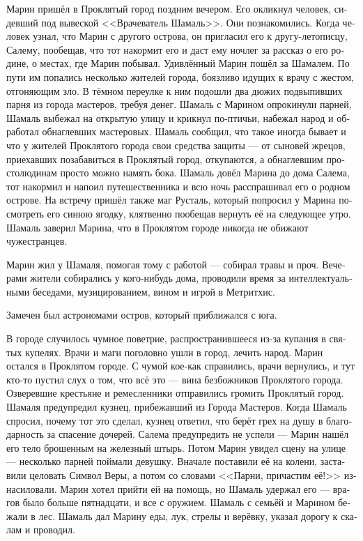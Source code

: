 \documentclass[a4paper,12pt,fleqn]{book}\usepackage{polyglossia}\setdefaultlanguage[babelshorthands=true]{russian}\setotherlanguage{english}\defaultfontfeatures{Ligatures=TeX,Mapping=tex-text}\usepackage{xcolor}\newcommand{\ml}[3]{#2}
\begin{document}
{Марин пришёл в Проклятый город поздним вечером.
Его окликнул человек, сидевший под вывеской <<Врачеватель Шамаль>>.
Они познакомились.
Когда человек узнал, что Марин с другого острова, он пригласил его к другу-летописцу, Салему, пообещав, что тот накормит его и даст ему ночлег за рассказ о его родине, о местах, где Марин побывал.
Удивлённый Марин пошёл за Шамалем.
По пути им попались несколько жителей города, боязливо идущих к врачу с жестом, отгоняющим зло.
В тёмном переулке к ним подошли два дюжих подвыпивших парня из города мастеров, требуя денег.
Шамаль с Марином опрокинули парней, Шамаль выбежал на открытую улицу и крикнул по-птичьи, набежал народ и обработал обнаглевших мастеровых.
Шамаль сообщил, что такое иногда бывает и что у жителей Проклятого города свои средства защиты --- от сыновей жрецов, приехавших позабавиться в Проклятый город, откупаются, а обнаглевшим простолюдинам просто можно намять бока.
Шамаль довёл Марина до дома Салема, тот накормил и напоил путешественника и всю ночь расспрашивал его о родном острове.
На встречу пришёл также маг Русталь, который попросил у Марина посмотреть его синюю ягодку, клятвенно пообещав вернуть её на следующее утро.
Шамаль заверил Марина, что в Проклятом городе никогда не обижают чужестранцев.

Марин жил у Шамаля, помогая тому с работой --- собирал травы и проч.
Вечерами жители собирались у кого-нибудь дома, проводили время за интеллектуальными беседами, музицированием, вином и игрой в Метритхис.

Замечен был астрономами остров, который приближался с юга.

В городе случилось чумное поветрие, распространившееся из-за купания в святых купелях.
Врачи и маги поголовно ушли в город, лечить народ.
Марин остался в Проклятом городе.
С чумой кое-как справились, врачи вернулись, и тут кто-то пустил слух о том, что всё это --- вина безбожников Проклятого города.
Озверевшие крестьяне и ремесленники отправились громить Проклятый город.
Шамаля предупредил кузнец, прибежавший из Города Мастеров.
Когда Шамаль спросил, почему тот это сделал, кузнец ответил, что берёт грех на душу в благодарность за спасение дочерей.
Салема предупредить не успели --- Марин нашёл его тело брошенным на железный штырь.
Потом Марин увидел сцену на улице --- несколько парней поймали девушку.
Вначале поставили её на колени, заставили целовать Символ Веры, а потом со словами <<Парни, причастим её!>> изнасиловали.
Марин хотел прийти ей на помощь, но Шамаль удержал его --- врагов было больше пятнадцати, и все с оружием.
Шамаль с семьёй и Марином бежали в лес.
Шамаль дал Марину еды, лук, стрелы и верёвку, указал дорогу к скалам и проводил.

}
\end{document}
